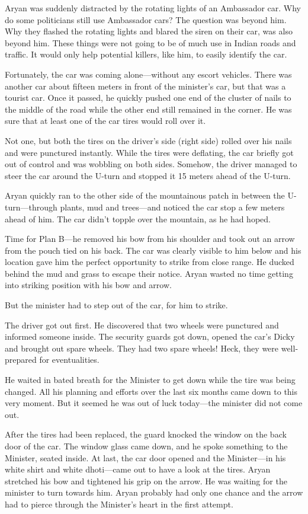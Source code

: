 Aryan was suddenly distracted by the rotating lights of an Ambassador car. Why
do some politicians still use Ambassador cars? The question was beyond him. Why
they flashed the rotating lights and blared the siren on their car, was also
beyond him. These things were not going to be of much use in Indian roads and
traffic. It would only help potential killers, like him, to easily identify the
car.

Fortunately, the car was coming alone—without any escort vehicles. There was
another car about fifteen meters in front of the minister's car, but that was a
tourist car. Once it passed, he quickly pushed one end of the cluster of nails
to the middle of the road while the other end still remained in the corner. He
was sure that at least one of the car tires would roll over it.

Not one, but both the tires on the driver's side (right side) rolled over his
nails and were punctured instantly. While the tires were deflating, the car
briefly got out of control and was wobbling on both sides. Somehow, the driver
managed to steer the car around the U-turn and stopped it 15 meters ahead of the
U-turn.

Aryan quickly ran to the other side of the mountainous patch in between the
U-turn—through plants, mud and trees—and noticed the car stop a few meters
ahead of him. The car didn't topple over the mountain, as he had hoped.

Time for Plan B—he removed his bow from his shoulder and took out an arrow
from the pouch tied on his back. The car was clearly visible to him below and
his location gave him the perfect opportunity to strike from close range. He
ducked behind the mud and grass to escape their notice. Aryan wasted no time
getting into striking position with his bow and arrow.

But the minister had to step out of the car, for him to strike.

The driver got out first. He discovered that two wheels were punctured and
informed someone inside. The security guards got down, opened the car's Dicky
and brought out spare wheels. They had two spare wheels! Heck, they were
well-prepared for eventualities.

He waited in bated breath for the Minister to get down while the tire was being
changed. All his planning and efforts over the last six months came down to this
very moment. But it seemed he was out of luck today—the minister did not come
out.

After the tires had been replaced, the guard knocked the window on the back door
of the car. The window glass came down, and he spoke something to the Minister,
seated inside. At last, the car door opened and the Minister—in his white
shirt and white dhoti—came out to have a look at the tires. Aryan stretched
his bow and tightened his grip on the arrow. He was waiting for the minister to
turn towards him. Aryan probably had only one chance and the arrow had to pierce
through the Minister's heart in the first attempt.

